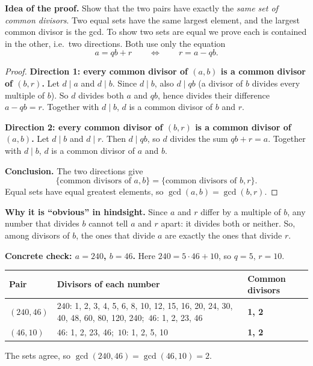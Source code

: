 \documentclass[11pt]{article}
\begin{document}
\textbf{Idea of the proof.} Show that the two pairs have exactly the \emph{same set of common divisors}. Two equal sets have the same largest element, and the largest common divisor is the gcd. To show two sets are equal we prove each is contained in the other, i.e.\ two directions. Both use only the equation
\[
a = qb + r \qquad\Longleftrightarrow\qquad r = a - qb .
\]

\begin{proof}
\textbf{Direction 1: every common divisor of $(a,b)$ is a common divisor of $(b,r)$.}
Let $d\mid a$ and $d\mid b$. Since $d\mid b$, also $d\mid qb$ (a divisor of $b$ divides every multiple of $b$). So $d$ divides both $a$ and $qb$, hence divides their difference $a-qb=r$. Together with $d\mid b$, $d$ is a common divisor of $b$ and $r$.

\textbf{Direction 2: every common divisor of $(b,r)$ is a common divisor of $(a,b)$.}
Let $d\mid b$ and $d\mid r$. Then $d\mid qb$, so $d$ divides the sum $qb+r=a$. Together with $d\mid b$, $d$ is a common divisor of $a$ and $b$.

\textbf{Conclusion.} The two directions give
\[
\{\text{common divisors of } a,b\}=\{\text{common divisors of } b,r\}.
\]
Equal sets have equal greatest elements, so $\gcd(a,b)=\gcd(b,r)$.
\end{proof}

\textbf{Why it is ``obvious'' in hindsight.} Since $a$ and $r$ differ by a multiple of $b$, any number that divides $b$ cannot tell $a$ and $r$ apart: it divides both or neither. So, among divisors of $b$, the ones that divide $a$ are exactly the ones that divide $r$.

\textbf{Concrete check: $a=240$, $b=46$.} Here $240=5\cdot46+10$, so $q=5$, $r=10$.
\begin{center}
\renewcommand{\arraystretch}{1.2}
\begin{tabular}{@{}l>{\raggedright\arraybackslash}p{9.6cm}l@{}}
\toprule
Pair & Divisors of each number & Common divisors \\
\midrule
$(240,46)$ & $240$: 1, 2, 3, 4, 5, 6, 8, 10, 12, 15, 16, 20, 24, 30, 40, 48, 60, 80, 120, 240;\ $46$: 1, 2, 23, 46 & \textbf{1, 2} \\
$(46,10)$ & $46$: 1, 2, 23, 46;\ $10$: 1, 2, 5, 10 & \textbf{1, 2} \\
\bottomrule
\end{tabular}
\end{center}
The sets agree, so $\gcd(240,46)=\gcd(46,10)=2$.
\end{document}
